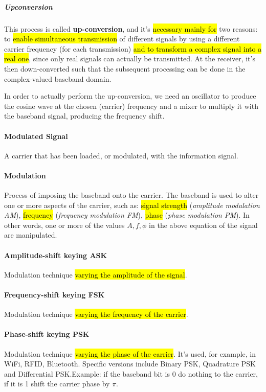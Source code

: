 \subparagraph{Upconversion}
This process is called \textbf{up-conversion}, and it's \hl{necessary mainly for}
two reasons: to \hl{enable simultaneous transmission} of different signals by using
a different carrier frequency (for each transmission) \hl{and to transform a
	complex signal into a real one}, since only real signals can actually be
transmitted. At the receiver, it's then down-converted such that the subsequent
processing can be done in the complex-valued baseband domain.

In order to actually perform the up-conversion, we need an oscillator to
produce the cosine wave at the chosen (carrier) frequency and a mixer to
multiply it with the baseband signal, producing the frequency shift.

\paragraph{Modulated Signal}
A carrier that has been loaded, or modulated, with the information signal.

\paragraph{Modulation}
Process of imposing the baseband onto the carrier. The baseband is used to
alter one or more aspects of the carrier, such as: \hl{signal strength} (\textit{amplitude
	modulation AM}), \hl{frequency} (\textit{frequency modulation FM}), \hl{phase}
(\textit{phase modulation PM}). In other words, one or more of the values $A, f, \phi$
in the above equation of the signal are manipulated.

\paragraph{Amplitude-shift keying ASK}
Modulation technique \hl{varying the amplitude of the signal}.

\paragraph{Frequency-shift keying FSK}
Modulation technique \hl{varying the frequency of the carrier}.

\paragraph{Phase-shift keying PSK}
Modulation technique \hl{varying the phase of the carrier}. It's used, for example,
in WiFi, RFID, Bluetooth. Specific versions include Binary PSK, Quadrature PSK
and Differential PSK.\@ Example: if the baseband bit is 0 do nothing to the
carrier, if it is 1 shift the carrier phase by $\pi$.

